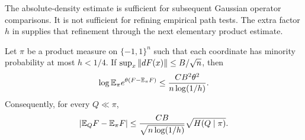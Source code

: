 The absolute-density estimate is sufficient for subsequent Gaussian
operator comparisons.  It is not sufficient for refining empirical
path tests.  The extra factor $h$ in  supplies
that refinement through the next elementary product estimate.

\begin{lemma}
\label{lem:path-product}
Let $\pi$ be a product measure on $\{-1,1\}^n$ such that each
coordinate has minority probability at most $h<1/4$.  If
$\sup_x\left\lVert dF(x)\right\rVert\le B/\sqrt n$, then
\begin{equation}
 \log\mathbb E_\pi e^{\theta(F-\mathbb E_\pi F)}
 \le\frac{CB^2\theta^2}{n\log(1/h)}.
 \label{eq:path-product-mgf}
\end{equation}
Consequently, for every $Q\ll\pi$,
\begin{equation}
 |\mathbb E_QF-\mathbb E_\pi F|
 \le\frac{CB}{\sqrt{n\log(1/h)}}\sqrt{H(Q\mid\pi)}.
 \label{eq:path-product-entropy}
\end{equation}
\end{lemma}

